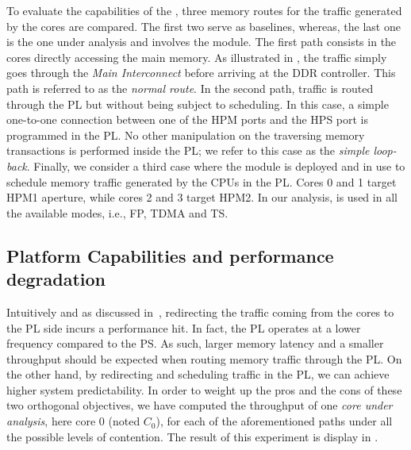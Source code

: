 To evaluate the capabilities of the \schim, three memory routes for
the traffic generated by the cores are compared. The first two serve
as baselines, whereas, the last one is the one under analysis and
involves the \schim module.  The first path consists in the cores
directly accessing the main memory. As illustrated in
, the traffic simply goes through the
\emph{Main Interconnect} before arriving at the DDR controller. This
path is referred to as the \emph{normal route}. In the second path,
traffic is routed through the PL but without being subject to
scheduling. In this case, a simple one-to-one connection between one
of the HPM ports and the HPS port is programmed in the PL. No other
manipulation on the traversing memory transactions is performed inside
the PL; we refer to this case as the \emph{simple loop-back}. Finally,
we consider a third case where the \schim module is deployed and in
use to schedule memory traffic generated by the CPUs in the PL. Cores
0 and 1 target HPM1 aperture, while cores 2 and 3 target HPM2. In our
analysis, \schim is used in all the available modes, i.e., FP, TDMA
and TS.

\subsection{Platform Capabilities and performance degradation}
\label{subsec:platform-capabilities-and-performance-degradation}
Intuitively and as discussed in~\cite{PLIM20}, redirecting the traffic
coming from the cores to the PL side incurs a performance hit. In
fact, the PL operates at a lower frequency compared to the PS. As
such, larger memory latency and a smaller throughput should be
expected when routing memory traffic through the PL. On the other
hand, by redirecting and scheduling traffic in the PL, we can achieve
higher system predictability.  In order to weight up the pros and the
cons of these two orthogonal objectives, we have computed the
throughput of one \emph{core under analysis}, here core 0 (noted
$C_{0}$), for each of the aforementioned paths under all the possible
levels of contention. The result of this experiment is display in
.

